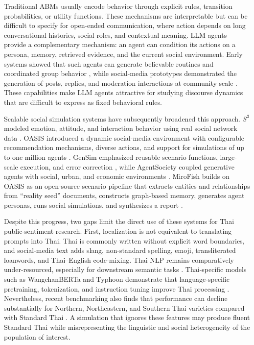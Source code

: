 \documentclass[10pt,twocolumn]{article}
\begin{document}
Traditional ABMs usually encode behavior through explicit rules, transition
probabilities, or utility functions. These mechanisms are interpretable but
can be difficult to specify for open-ended communication, where action depends
on long conversational histories, social roles, and contextual meaning. LLM
agents provide a complementary mechanism: an agent can condition its actions
on a persona, memory, retrieved evidence, and the current social environment.
Early systems showed that such agents can generate believable routines and
coordinated group behavior \citep{park2023generative}, while social-media
prototypes demonstrated the generation of posts, replies, and moderation
interactions at community scale \citep{park2022social}. These capabilities
make LLM agents attractive for studying discourse dynamics that are difficult
to express as fixed behavioral rules.

Scalable social simulation systems have subsequently broadened this approach.
$S^3$ modeled emotion, attitude, and interaction behavior using real social
network data \citep{gao2023s3}. OASIS introduced a dynamic social-media
environment with configurable recommendation mechanisms, diverse actions, and
support for simulations of up to one million agents
\citep{yang2024oasis}. GenSim emphasized reusable scenario functions,
large-scale execution, and error correction \citep{tang2025gensim}, while
AgentSociety coupled generative agents with social, urban, and economic
environments \citep{piao2025agentsociety}. MiroFish builds on OASIS as an
open-source scenario pipeline that extracts entities and relationships from
``reality seed'' documents, constructs graph-based memory, generates agent
personas, runs social simulations, and synthesizes a report
\citep{mirofish2026}.

Despite this progress, two gaps limit the direct use of these systems for Thai
public-sentiment research. First, localization is not equivalent to translating
prompts into Thai. Thai is commonly written without explicit word boundaries,
and social-media text adds slang, non-standard spelling, emoji, transliterated
loanwords, and Thai--English code-mixing. Thai NLP remains comparatively
under-resourced, especially for downstream semantic tasks
\citep{arreerard2022survey,phatthiyaphaibun2023pythainlp}. Thai-specific
models such as WangchanBERTa and Typhoon demonstrate that language-specific
pretraining, tokenization, and instruction tuning improve Thai processing
\citep{lowphansirikul2021wangchanberta,pipatanakul2023typhoon}. Nevertheless,
recent benchmarking also finds that performance can decline substantially for
Northern, Northeastern, and Southern Thai varieties compared with Standard
Thai \citep{limkonchotiwat2025dialects}. A simulation that ignores these
features may produce fluent Standard Thai while misrepresenting the linguistic
and social heterogeneity of the population of interest.
\end{document}
